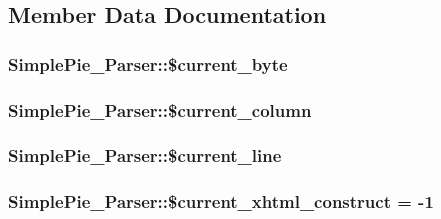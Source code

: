 \subsection{Member Data Documentation}
\hypertarget{class_simple_pie___parser_ac04dc0fe946a71a8a84e7d78b198f239}{
\subsubsection[{\$current\-\_\-byte}]{\setlength{\rightskip}{0pt plus 5cm}Simple\-Pie\-\_\-\-Parser\-::\$current\-\_\-byte}}\label{class_simple_pie___parser_ac04dc0fe946a71a8a84e7d78b198f239}
\hypertarget{class_simple_pie___parser_a7ef992c4fddf60201d0a26e9e2cf9f41}{
\subsubsection[{\$current\-\_\-column}]{\setlength{\rightskip}{0pt plus 5cm}Simple\-Pie\-\_\-\-Parser\-::\$current\-\_\-column}}\label{class_simple_pie___parser_a7ef992c4fddf60201d0a26e9e2cf9f41}
\hypertarget{class_simple_pie___parser_afcee171a99e2c778b3b48c75093fcb43}{
\subsubsection[{\$current\-\_\-line}]{\setlength{\rightskip}{0pt plus 5cm}Simple\-Pie\-\_\-\-Parser\-::\$current\-\_\-line}}\label{class_simple_pie___parser_afcee171a99e2c778b3b48c75093fcb43}
\hypertarget{class_simple_pie___parser_a84f446493f5def8fa688fed79d23f53f}{
\subsubsection[{\$current\-\_\-xhtml\-\_\-construct}]{\setlength{\rightskip}{0pt plus 5cm}Simple\-Pie\-\_\-\-Parser\-::\$current\-\_\-xhtml\-\_\-construct = -\/1}}\label{class_simple_pie___parser_a84f446493f5def8fa688fed79d23f53f}
